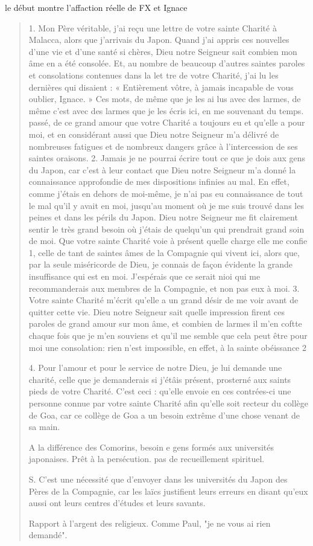 \begin{Synthesis}
le début montre l'affaction réelle de FX et Ignace
\end{Synthesis}
\begin{quote}
    1. Mon Père véritable, j'ai reçu une lettre de votre sainte Charité à Malacca, alors que j'arrivais du Japon. Quand j'ai appris
ces nouvelles d'une vie et d'une santé si chères, Dieu notre Seigneur
sait combien mon âme en a été consolée. Et, au nombre de beaucoup
d'autres saintes paroles et consolations contenues dans la let
tre de votre Charité, j'ai lu les dernières qui disaient : « Entièrement
vôtre, à jamais incapable de vous oublier, Ignace. » Ces
mots, de même que je les ai lus avec des larmes, de même c'est avec
des larmes que je les écris ici, en me souvenant du temps. passé,
de ce grand amour que votre Charité a toujours eu et qu'elle a pour
moi, et en considérant aussi que Dieu notre Seigneur m'a délivré
de nombreuses fatigues et de nombreux dangers grâce à l'intercession
de ses saintes oraisons.
2. Jamais je ne pourrai écrire tout ce que je dois aux gens du
Japon, car c'est à leur contact que Dieu notre Seigneur m'a donné
la connaissance approfondie de mes dispositions infinies au mal.
En effet, comme j'étais en dehors de moi-même, je n'ai pas eu
connaissance de tout le mal qu'il y avait en moi, jusqu'au moment
où je me suis trouvé dans les peines et dans les périls du Japon.
Dieu notre Seigneur me fit clairement sentir le très grand besoin
où j'étais de quelqu'un qui prendrait grand soin de moi. Que votre
sainte Charité voie à présent quelle charge elle me confie 1, celle
de tant de saintes âmes de la Compagnie qui vivent ici, alors que,
par la seule miséricorde de Dieu, je connais de façon évidente la
grande insuffisance qui est en moi. J'espérais que ce serait nioi qui
me recommanderais aux membres de la Compagnie, et non pas eux
à moi.
3. Votre sainte Charité m'écrit qu'elle a un grand désir de me
voir avant de quitter cette vie. Dieu notre Seigneur sait quelle
impression firent ces paroles de grand amour sur mon âme, et
combien de larmes il m'en coftte chaque fois que je m'en souviens
et qu'il me semble que cela peut être pour moi une consolation:
rien n'est impossible, en effet, à la sainte obéissance 2

4. Pour l'amour et pour le service de notre Dieu, je lui demande
une charité, celle que je demanderais si j'étâis présent, prosterné
aux saints pieds de votre Charité. C'est ceci : qu'elle envoie en ces
contrées-ci une personne connue par votre sainte Charité afin
qu'elle soit recteur du collège de Goa, car ce collège de Goa a un
besoin extrême d'une chose venant de sa main.
\begin{Synthesis}
A la différence des Comorins, besoin e gens formés aux universités japonaises. Prêt à la persécution. pas de recueillement spirituel. 
\end{Synthesis}
S. C'est une nécessité que d'envoyer dans les universités du
    Japon des Pères de la Compagnie, car les laïcs justifient leurs
erreurs en disant qu'eux aussi ont leurs centres d'études et leurs
savants.
\begin{Synthesis}
Rapport à l'argent des religieux. Comme Paul, "je ne vous ai rien demandé".


\end{Synthesis}
\end{quote}
